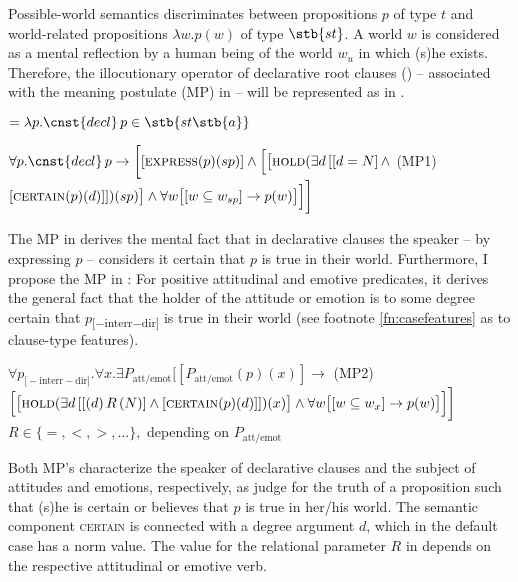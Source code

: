 \documentclass[output=paper,
colorlinks,
citecolor=brown,
newtxmath
]{langscibook}
\begin{document}
Possible-world semantics discriminates between propositions $p$ of type $t$ and world-related propositions $\lambda w. p(w)$ of type $\stb{st}$. A world $w$ is considered as a mental reflection by a human being of the world $w_u$ in which (s)he exists. Therefore, the illocutionary operator of declarative root clauses () -- associated with the meaning postulate (MP) in  -- will be represented as in .

\ea\label{ex:12}  $= \lambda p . \cnst{decl} \, p \in \stb{st\stb{a}}$
\z

\ea\label{ex:13}
$\forall p . \cnst{decl} \, p \rightarrow \bigg[[\textsc{express} (p) (sp)] \wedge \Big[\big[\textsc{hold} (\exists d \, [[d = N] \, \wedge$ \hfill (MP1) \newline $[\textsc{certain} (p) (d)]]) (sp)\big] \wedge \forall w \big[[w \subseteq w_{sp}] \rightarrow p(w)\big]\Big]\bigg]$
\z

\noindent The MP in  derives the mental fact that in declarative clauses the speaker -- by expressing $p$ -- considers it certain that $p$ is true in their world. Furthermore, I propose the MP in : For positive attitudinal and emotive predicates, it derives the general fact that the holder of the attitude or emotion is to some degree certain that $p$\textsubscript{[$-$interr$-$dir]} is true in their world (see footnote \ref{fn:casefeatures} as to clause-type features).

\ea\label{ex:14} $\forall p_\textrm{[$-$interr$-$dir]} . \forall x . \exists P_\textrm{att/emot} \bigg[[P_\textrm{att/emot} (p)(x)] \rightarrow$ \hfill (MP2) \newline $\Big[\big[\textsc{hold} (\exists d \, [[(d) \, R \, (N)] \wedge [\textsc{certain} (p) (d)]]) (x)\big] \wedge \forall w \big[[w \subseteq w_x] \rightarrow p(w)\big]\Big]\bigg]$ \\ {\small $R \in \{=,<,>,{\dots}\},$ depending on $P_\textrm{att/emot}$}
\z

\noindent Both MP's characterize the speaker of declarative clauses and the subject of attitudes and emotions, respectively, as judge for the truth of a proposition such that (s)he is certain or believes that $p$ is true in her/his world. The semantic component \textsc{certain} is connected with a degree argument $d$, which in the default case has a norm value. The value for the relational parameter $R$ in  depends on the respective attitudinal or emotive verb.
\end{document}
